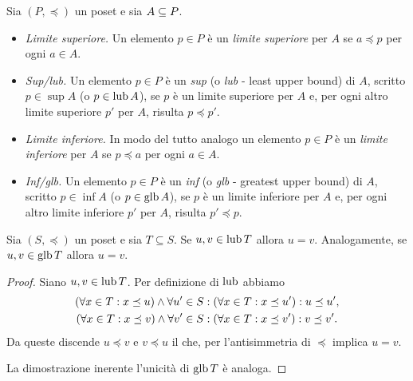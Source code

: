 \begin{definizione} 
Sia $(P, \preceq)$ un poset e sia $A \subseteq P$.
\begin{itemize}
\item \emph{Limite superiore.} 
Un elemento $p \in P$ \`e un \emph{limite superiore} per $A$
se $a \preceq p$ per ogni $a\in A$.
\item \emph{Sup/lub.} 
Un elemento $p \in P$ \`e un \emph{sup} (o \emph{lub} - least upper bound) di $A$,
scritto $p \in \sup A$ (o $p \in \mathop{\mathrm{lub}}\nolimits A$),
se $p$ \`e un limite superiore per $A$ e,
per ogni altro limite superiore $p'$ per $A$,
risulta $p \preceq p'$.
\item \emph{Limite inferiore.}
In modo del tutto analogo un elemento $p \in P$ \`e un \emph{limite inferiore}
per $A$ se $p \preceq a$ per ogni $a \in A$.
\item \emph{Inf/glb.}
Un elemento $p \in P$ \`e un \emph{inf} (o \emph{glb} - greatest upper bound) di $A$,
scritto $p \in \inf A$ (o $p \in \mathop{\mathrm{glb}}\nolimits A$),
se $p$ \`e un limite inferiore per $A$ e,
per ogni altro limite inferiore $p'$ per $A$, risulta $p' \preceq p$.
\end{itemize}




\end{definizione}

\begin{proposizione} 
\label{prop:unicita_lub_glb}
Sia $(S, \preceq)$ un poset e sia $T \subseteq S$.
Se $u, v \in \mathop{\mathrm{lub}}\nolimits T$ allora $u = v$.
Analogamente, se $u, v \in \mathop{\mathrm{glb}}\nolimits T$ allora $u = v$.
\end{proposizione}
\begin{proof}
Siano $u, v \in \mathop{\mathrm{lub}}\nolimits T$.  Per definizione di $\mathop{\mathrm{lub}}\nolimits$ abbiamo
\begin{align*}
  (\forall x \in T \mathrel{:} x \preceq u)
    \land
      \forall u' \in S
        &\mathrel{:} (\forall x \in T \mathrel{:} x \preceq u') \mathrel{:} u \preceq u', \\
  (\forall x \in T \mathrel{:} x \preceq v)
    \land
      \forall v' \in S
        &\mathrel{:} (\forall x \in T \mathrel{:} x \preceq v') \mathrel{:} v \preceq v'.
\end{align*}
Da queste discende $u \preceq v$ e $v \preceq u$ il che,
per l'antisimmetria di $\preceq$ implica $u = v$.

La dimostrazione inerente l'unicità di $\mathop{\mathrm{glb}}\nolimits T$ è analoga.
\end{proof}

